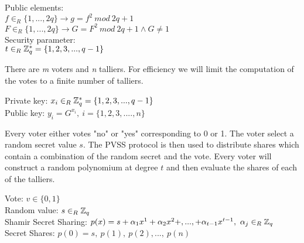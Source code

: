 \noindent
\begin{infobox}
Public elements:\\
\begin{math}f \in_R \{1,...,2q\} \rightarrow g= f^2 \ mod\ 2q+1\end{math}\\
\begin{math}F \in_R \{1,...,2q\}\rightarrow G= F^2 \ mod\ 2q+1 \wedge G\neq1\end{math}\\
Security parameter:\\
\begin{math} t \in_R \mathbb{Z}_q^* = \{1,2,3,...,q-1\} \end{math}
\end{infobox}


\noindent
There are \textit{m} voters and \textit{n} talliers. For efficiency we will limit the computation of the votes to a finite number of talliers. 

\noindent
\begin{infobox}
Private key: \begin{math}x_{i} \in_R \mathbb{Z}_q^* = \{1,2,3,...,q-1\}\end{math}\\
Public key: \begin{math}y_i=G^{x_i} ,\ i=\{1,2,3,...., n \}  \end{math}
\end{infobox}


\noindent
Every voter either votes "no" or "yes" corresponding to 0 or 1. The voter select a random secret value \begin{math}s \end{math}. The PVSS protocol is then used to distribute shares which contain a combination of the random secret and the vote. Every voter will construct a random polynomium at degree $t$ and then evaluate the shares  of each of the talliers.


\noindent
\begin{infobox}
Vote: \begin{math}v\in\{0,1\} \end{math}\\
Random value: \begin{math} s\in_R \mathbb{Z}_q \end{math}\\ 
Shamir Secret Sharing: \begin{math} p(x)=s+\alpha_1x^1+\alpha_2x^2+,...,+\alpha_{t-1}x^{t-1}, \ \alpha_j\in_R \Z_q  \end{math}\\
Secret Shares: \begin{math} p(0)=s,\ p(1),\ p(2),...,\ p(n) \end{math}
\end{infobox}


